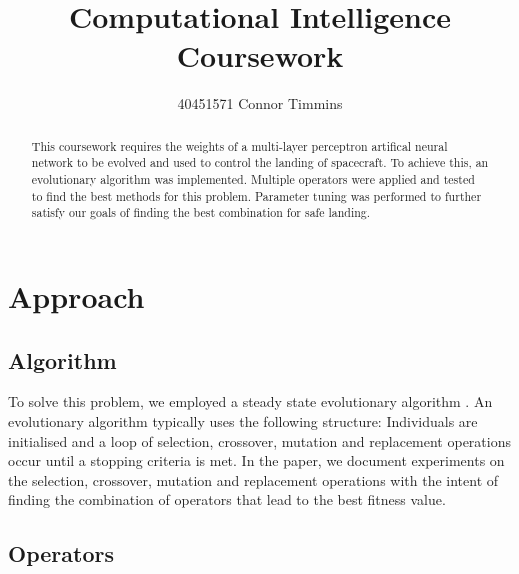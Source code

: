 \documentclass[sigconf]{acmart}
\begin{document}
\title{Computational Intelligence Coursework}

\author{40451571 Connor Timmins}



\begin{abstract}This coursework requires the weights of a multi-layer perceptron artifical neural network to be evolved and used to control the landing of spacecraft. To achieve this, an evolutionary algorithm was implemented. Multiple operators were applied and tested to find the best methods for this problem. Parameter tuning was performed to further satisfy our goals of finding the best combination for safe landing.
\end{abstract}





\maketitle

\section{Approach}
\subsection{Algorithm}
To solve this problem, we employed a steady state evolutionary algorithm \cite{SteadyState}.
An evolutionary algorithm typically uses the following structure: Individuals are initialised and a loop of selection, crossover, mutation and replacement operations occur until a stopping criteria is met. In the paper, we document experiments on the selection, crossover, mutation and replacement operations with the intent of finding the combination of operators that lead to the best fitness value.

\subsection{Operators}
\end{document}
